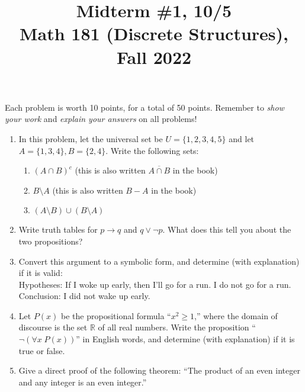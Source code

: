 \documentclass[11pt]{article}
\title{Midterm \#1, 10/5 \\Math 181 (Discrete Structures), Fall 2022}
\date{}
\begin{document}
\maketitle

\thispagestyle{empty}

\vspace{-1cm}

Each problem is worth 10 points, for a total of 50 points. Remember to \emph{show your work} and \emph{explain your answers} on all problems!

\begin{enumerate}
\item In this problem, let the universal set be $U = \{1,2,3,4,5\}$ and let $A=\{1,3,4\}, B=\{2,4\}$. Write the following sets:
\begin{enumerate}
\item $(A\cap B)^c$ \hfill (this is also written $\overline{A\cap B}$ in the book)
\item $B \setminus A$ \hfill (this is also written $B-A$ in the book)
\item $(A \setminus B) \cup (B \setminus A)$
\end{enumerate}
\item Write truth tables for $p \to q$ and $q \vee \neg p$. What does this tell you about the two propositions?
\item Convert this argument to a symbolic form, and determine (with explanation) if it is valid: \\[0.5em]
Hypotheses: If I woke up early, then I'll go for a run. I do not go for a run. \\
Conclusion: I did not wake up early.
\item Let $P(x)$ be the propositional formula ``$x^2 \geq 1$,'' where the domain of discourse is the set $\mathbb{R}$ of all real numbers. Write the proposition ``$\neg (\forall x \; P(x))$'' in English words, and determine (with explanation) if it is true or false.
\item Give a direct proof of the following theorem: ``The product of an even integer and any integer is an even integer.''
\end{enumerate}
\end{document}
